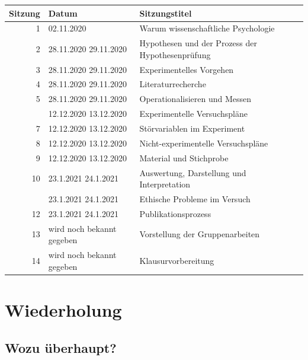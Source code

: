 \documentclass[
]{book}
\begin{document}
\begin{tabular}[t]{rll}
\toprule
Sitzung & Datum & Sitzungstitel\\
\midrule
1 & 02.11.2020 & Warum wissenschaftliche Psychologie\\
2 & 28.11.2020
29.11.2020 & Hypothesen und der Prozess der Hypothesenprüfung\\
3 & 28.11.2020
29.11.2020 & Experimentelles Vorgehen\\
4 & 28.11.2020
29.11.2020 & Literaturrecherche\\
5 & 28.11.2020
29.11.2020 & Operationalisieren und Messen\\
\addlinespace
6 & 12.12.2020
13.12.2020 & Experimentelle Versuchspläne\\
7 & 12.12.2020
13.12.2020 & Störvariablen im Experiment\\
8 & 12.12.2020
13.12.2020 & Nicht-experimentelle Versuchspläne\\
9 & 12.12.2020
13.12.2020 & Material und Stichprobe\\
10 & 23.1.2021
24.1.2021 & Auswertung, Darstellung und Interpretation\\
\addlinespace
11 & 23.1.2021
24.1.2021 & Ethische Probleme im Versuch\\
12 & 23.1.2021
24.1.2021 & Publikationsprozess\\
13 & wird noch bekannt gegeben & Vorstellung der Gruppenarbeiten\\
14 & wird noch bekannt gegeben & Klausurvorbereitung\\
\bottomrule
\end{tabular}

\hypertarget{wiederholung-3}{%
\section{Wiederholung}\label{wiederholung-3}}

\hypertarget{wozu-uxfcberhaupt-1}{%
\subsection{Wozu überhaupt?}\label{wozu-uxfcberhaupt-1}}
\end{document}
